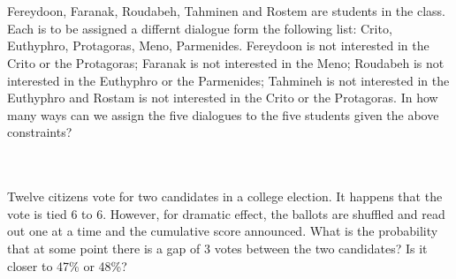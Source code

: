 \documentclass[12pt,letterpaper,boxed]{hmcpset}
\DeclarePairedDelimiter\\floor{\\lfloor}{\\rfloor}
\begin{document}
\begin{problem}[Shahriari 8.3.10][20]\\
\\
Fereydoon, Faranak, Roudabeh, Tahminen and Rostem are students in the class. Each is to be assigned a differnt dialogue form the following list: Crito, Euthyphro, Protagoras, Meno, Parmenides. Fereydoon is not interested in the Crito or the Protagoras; Faranak is not interested in the Meno; Roudabeh is not interested in the Euthyphro or the Parmenides; Tahmineh is not interested in the Euthyphro and Rostam is not interested in the Crito or the Protagoras. In how many ways can we assign the five dialogues to the five students given the above constraints?

\end{problem}
\begin{problem}[Shahriari 8.X.1][20]\\
\\
 Twelve citizens vote for two candidates in a college election. It happens that the vote
is tied 6 to 6. However, for dramatic effect, the ballots are shuffled and read out one at a time
and the cumulative score announced. What is the probability that at some point there is a
gap of 3 votes between the two candidates? Is it closer to 47\% or 48\%?

\end{problem}
\end{document}
